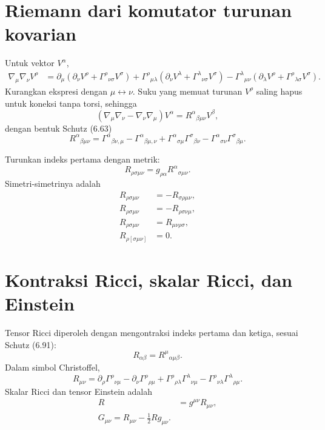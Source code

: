 \documentclass[12pt,a4paper]{report}
\newcommand{\pd}{\partial}
\begin{document}
\section{Riemann dari komutator turunan kovarian}

Untuk vektor $V^\alpha$,
\begin{align}
 \nabla_\mu\nabla_\nu V^\rho
 &=\pd_\mu(\pd_\nu V^\rho+\Gamma^\rho{}_{\nu\sigma}V^\sigma)
 +\Gamma^\rho{}_{\mu\lambda}(\pd_\nu V^\lambda
 +\Gamma^\lambda{}_{\nu\sigma}V^\sigma)
 -\Gamma^\lambda{}_{\mu\nu}(\pd_\lambda V^\rho
 +\Gamma^\rho{}_{\lambda\sigma}V^\sigma).
\end{align}
Kurangkan ekspresi dengan $\mu\leftrightarrow\nu$. Suku yang memuat turunan
$V^\rho$ saling hapus untuk koneksi tanpa torsi, sehingga
\[
 (\nabla_\mu\nabla_\nu-\nabla_\nu\nabla_\mu)V^\alpha
 =R^\alpha{}_{\beta\mu\nu}V^\beta,
\]
dengan bentuk Schutz (6.63)
\[
 \boxed{
 R^\alpha{}_{\beta\mu\nu}
 =\Gamma^\alpha{}_{\beta\nu,\mu}
 -\Gamma^\alpha{}_{\beta\mu,\nu}
 +\Gamma^\alpha{}_{\sigma\mu}\Gamma^\sigma{}_{\beta\nu}
 -\Gamma^\alpha{}_{\sigma\nu}\Gamma^\sigma{}_{\beta\mu}}.
\]

Turunkan indeks pertama dengan metrik:
\[
 R_{\rho\sigma\mu\nu}=g_{\rho\alpha}R^\alpha{}_{\sigma\mu\nu}.
\]
Simetri-simetrinya adalah
\begin{align}
 R_{\rho\sigma\mu\nu}&=-R_{\sigma\rho\mu\nu},\\
 R_{\rho\sigma\mu\nu}&=-R_{\rho\sigma\nu\mu},\\
 R_{\rho\sigma\mu\nu}&=R_{\mu\nu\rho\sigma},\\
 R_{\rho[\sigma\mu\nu]}&=0.
\end{align}

\section{Kontraksi Ricci, skalar Ricci, dan Einstein}

Tensor Ricci diperoleh dengan mengontraksi indeks pertama dan ketiga, sesuai
Schutz (6.91):
\[
 \boxed{R_{\alpha\beta}=R^\mu{}_{\alpha\mu\beta}}.
\]
Dalam simbol Christoffel,
\[
 R_{\mu\nu}
 =\pd_\rho\Gamma^\rho{}_{\nu\mu}
 -\pd_\nu\Gamma^\rho{}_{\rho\mu}
 +\Gamma^\rho{}_{\rho\lambda}\Gamma^\lambda{}_{\nu\mu}
 -\Gamma^\rho{}_{\nu\lambda}\Gamma^\lambda{}_{\rho\mu}.
\]
Skalar Ricci dan tensor Einstein adalah
\begin{align}
 R&=g^{\mu\nu}R_{\mu\nu},\\
 \boxed{G_{\mu\nu}=R_{\mu\nu}-\frac12Rg_{\mu\nu}}.
\end{align}
\end{document}
